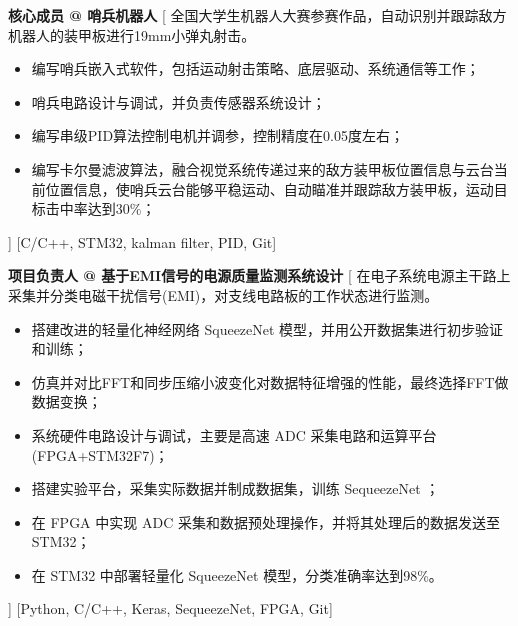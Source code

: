 \begin{experiences}
    {\textbf{核心成员 @ 哨兵机器人}}%
    [
    全国大学生机器人大赛参赛作品，自动识别并跟踪敌方机器人的装甲板进行19mm小弹丸射击。
        \begin{itemize}
            \item {编写哨兵嵌入式软件，包括运动射击策略、底层驱动、系统通信等工作；}
            \item {哨兵电路设计与调试，并负责传感器系统设计；}
            \item {编写串级PID算法控制电机并调参，控制精度在0.05度左右；}
            \item {编写卡尔曼滤波算法，融合视觉系统传递过来的敌方装甲板位置信息与云台当前位置信息，使哨兵云台能够平稳运动、自动瞄准并跟踪敌方装甲板，运动目标击中率达到30\%；}
        \end{itemize}
    ]
    [C/C++, STM32, kalman filter, PID, Git]
    \separator{0.5ex}

    {\textbf{项目负责人 @ 基于EMI信号的电源质量监测系统设计 }}%
    [
    在电子系统电源主干路上采集并分类电磁干扰信号(EMI)，对支线电路板的工作状态进行监测。
        \begin{itemize}
            \item {搭建改进的轻量化神经网络 SqueezeNet 模型，并用公开数据集进行初步验证和训练；}
            \item {仿真并对比FFT和同步压缩小波变化对数据特征增强的性能，最终选择FFT做数据变换；}
            \item {系统硬件电路设计与调试，主要是高速 ADC 采集电路和运算平台(FPGA+STM32F7)；}
            \item {搭建实验平台，采集实际数据并制成数据集，训练 SequeezeNet ；}
            \item {在 FPGA 中实现 ADC 采集和数据预处理操作，并将其处理后的数据发送至STM32；}
            \item {在 STM32 中部署轻量化 SqueezeNet 模型，分类准确率达到98\%。}
        \end{itemize}]
    [Python, C/C++, Keras, SequeezeNet, FPGA, Git]
    

\end{experiences}

